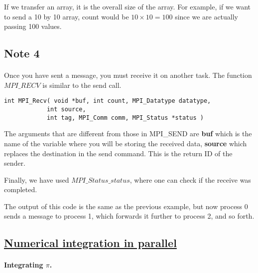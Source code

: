 \documentclass[%
oneside,                 %
final,                   %
10pt]{article}
\begin{document}
If we transfer an array, it is  the overall size of the array. 
For example, if we want to send a 10 by 10 array, count would be $10\times 10=100$ 
since we are  actually passing 100 values.




\subsection*{Note 4}

\paragraph{}

Once you have  sent a message, you must receive it on another task. The function $MPI\_RECV$
is similar to the send call.
\begin{verbatim}
int MPI_Recv( void *buf, int count, MPI_Datatype datatype, 
            int source, 
            int tag, MPI_Comm comm, MPI_Status *status )
\end{verbatim}

The arguments that are different from those in MPI\_SEND are
\textbf{buf} which  is the name of the variable where you will  be storing the received data, 
\textbf{source} which  replaces the destination in the send command. This is the return ID of the sender.

Finally,  we have used  $MPI\_Status\_status$,  
where one can check if the receive was completed.

The output of this code is the same as the previous example, but now
process 0 sends a message to process 1, which forwards it further
to process 2, and so forth.



\subsection*{\href{{https://github.com/CompPhysics/ComputationalPhysics2/blob/gh-pages/doc/Programs/LecturePrograms/programs/MPI/chapter07/program6.cpp}}{Numerical integration in parallel}}

\paragraph{Integrating $\pi$.}
\end{document}
